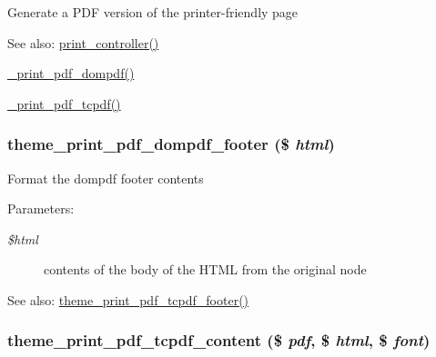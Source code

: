 Generate a PDF version of the printer-friendly page

\begin{Desc}
\item[See also:]\hyperlink{print_8pages_8inc_aef613d2eb4448233d3600d0d7259e95}{print\_\-controller()} 

\hyperlink{print__pdf_8pages_8inc_1f00c18b79a7115894bd9495c887ea72}{\_\-print\_\-pdf\_\-dompdf()} 

\hyperlink{print__pdf_8pages_8inc_f7356382db2bd5990ed0b420128053e9}{\_\-print\_\-pdf\_\-tcpdf()} \end{Desc}
\hypertarget{print__pdf_8pages_8inc_fd0092da5b0cfe60cabf1b30b818c9e7}{
\subsubsection[{theme\_\-print\_\-pdf\_\-dompdf\_\-footer}]{\setlength{\rightskip}{0pt plus 5cm}theme\_\-print\_\-pdf\_\-dompdf\_\-footer (\$ {\em html})}}
\label{print__pdf_8pages_8inc_fd0092da5b0cfe60cabf1b30b818c9e7}


Format the dompdf footer contents

\begin{Desc}
\item[Parameters:]
\begin{description}
\item[{\em \$html}]contents of the body of the HTML from the original node \end{description}
\end{Desc}
\begin{Desc}
\item[See also:]\hyperlink{print__pdf_8pages_8inc_25f419982a26a07b6a35d7756a432b4e}{theme\_\-print\_\-pdf\_\-tcpdf\_\-footer()} \end{Desc}
\hypertarget{print__pdf_8pages_8inc_940cf9ed2d75d587a14285aec0f01f35}{
\subsubsection[{theme\_\-print\_\-pdf\_\-tcpdf\_\-content}]{\setlength{\rightskip}{0pt plus 5cm}theme\_\-print\_\-pdf\_\-tcpdf\_\-content (\$ {\em pdf}, \/  \$ {\em html}, \/  \$ {\em font})}}
\label{print__pdf_8pages_8inc_940cf9ed2d75d587a14285aec0f01f35}


